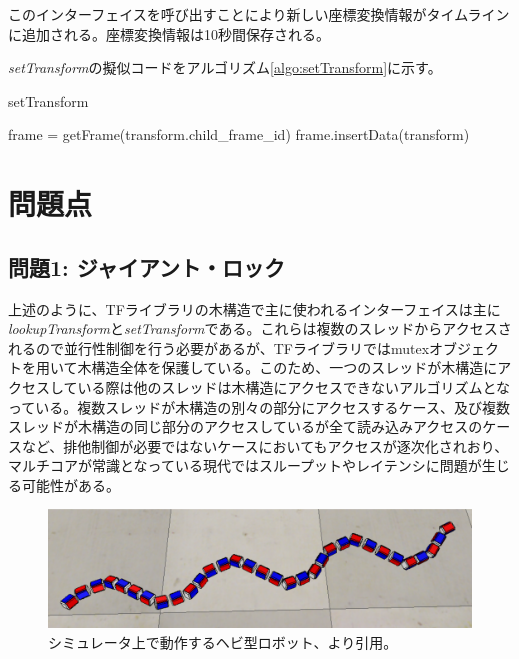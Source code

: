 \documentclass[a4paper]{jreport}	%
\begin{document}
このインターフェイスを呼び出すことにより新しい座標変換情報がタイムラインに追加される。座標変換情報は10秒間保存される。

\textit{setTransform}の擬似コードをアルゴリズム\ref{algo:setTransform}に示す。


\begin{algorithm}
\caption{setTransform}\label{algo:setTransform}
\begin{algorithmic}[1]
	 
	\State frame = getFrame(transform.child\_frame\_id)
	\State frame.insertData(transform)
	\EndProcedure
\end{algorithmic}
\end{algorithm}

\section{問題点}
\subsection*{問題1: ジャイアント・ロック}
上述のように、TFライブラリの木構造で主に使われるインターフェイスは主に\textit{lookupTransform}と\textit{setTransform}である。これらは複数のスレッドからアクセスされるので並行性制御を行う必要があるが、TFライブラリではmutexオブジェクトを用いて木構造全体を保護している。このため、一つのスレッドが木構造にアクセスしている際は他のスレッドは木構造にアクセスできないアルゴリズムとなっている。複数スレッドが木構造の別々の部分にアクセスするケース、及び複数スレッドが木構造の同じ部分のアクセスしているが全て読み込みアクセスのケースなど、排他制御が必要ではないケースにおいてもアクセスが逐次化されおり、マルチコアが常識となっている現代ではスループットやレイテンシに問題が生じる可能性がある。

\begin{figure}[h] 
\centering
\includegraphics[width=15cm]{snake-sim2}	
\caption{シミュレータ上で動作するヘビ型ロボット、\cite{snake-sim}より引用。
}
\label{fig:snake-sim2}
\end{figure}
\end{document}
